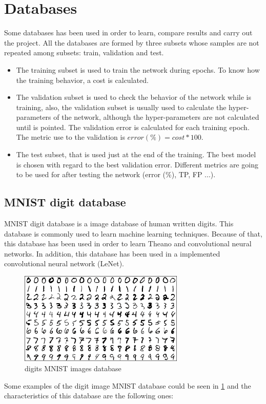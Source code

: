 \section{Databases}
Some databases has been used in order to learn, compare results and carry out the project. All the databases are formed by three subsets whose samples are not repeated among subsets: train, validation and test.

\begin{itemize}
\item The training subset is used to train the network during epochs. To know how the training behavior, a cost is calculated.
\item The validation subset is used to check the behavior of the network while is training, also, the validation subset is usually used to calculate the hyper-parameters of the network, although the hyper-parameters are not calculated until is pointed. The validation error is calculated for each training epoch. The metric use to the validation is $error(\%) = cost*100$.
\item  The test subset, that is used just at the end of the training. The best model is chosen with regard to the best validation error. Different metrics are going to be used for after testing the network (error (\%), TP, FP ...).
\end{itemize}

\subsection{MNIST digit database}\label{subsec:MNIST}
MNIST digit database is a image database of human written digits. This database is commonly used to learn machine learning techniques. Because of that, this database has been used in order to learn Theano and convolutional neural networks. In addition, this database has been used in a implemented convolutional neural network (LeNet).\\
\begin{figure}[htb]
\centering
\includegraphics[width=0.7\textwidth]{images_databases/mnistExamples.png}
\caption{digits MNIST images database} \label{fig:MNIST_digits}
\end{figure}
Some examples of the digit image MNIST database could be seen in \ref{fig:MNIST_digits} and the characteristics of this database are the following ones:


